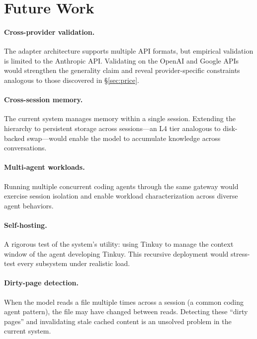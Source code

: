 \documentclass[sigplan,screen,anonymous]{acmart}
\begin{document}

\section{Future Work}

\paragraph{Cross-provider validation.}
The adapter architecture supports multiple API formats, but empirical
validation is limited to the Anthropic API. Validating on the
OpenAI and Google APIs would strengthen the generality claim and
reveal provider-specific constraints analogous to those discovered
in \S\ref{sec:price}.

\paragraph{Cross-session memory.}
The current system manages memory within a single session. Extending
the hierarchy to persistent storage across sessions---an L4 tier
analogous to disk-backed swap---would enable the model to accumulate
knowledge across conversations.

\paragraph{Multi-agent workloads.}
Running multiple concurrent coding agents through the same gateway
would exercise session isolation and enable workload characterization
across diverse agent behaviors.

\paragraph{Self-hosting.}
A rigorous test of the system's utility: using Tinkuy to manage the
context window of the agent developing Tinkuy. This recursive
deployment would stress-test every subsystem under realistic load.

\paragraph{Dirty-page detection.}
When the model reads a file multiple times across a session (a common
coding agent pattern), the file may have changed between reads.
Detecting these ``dirty pages'' and invalidating stale cached
content is an unsolved problem in the current system.
\end{document}
